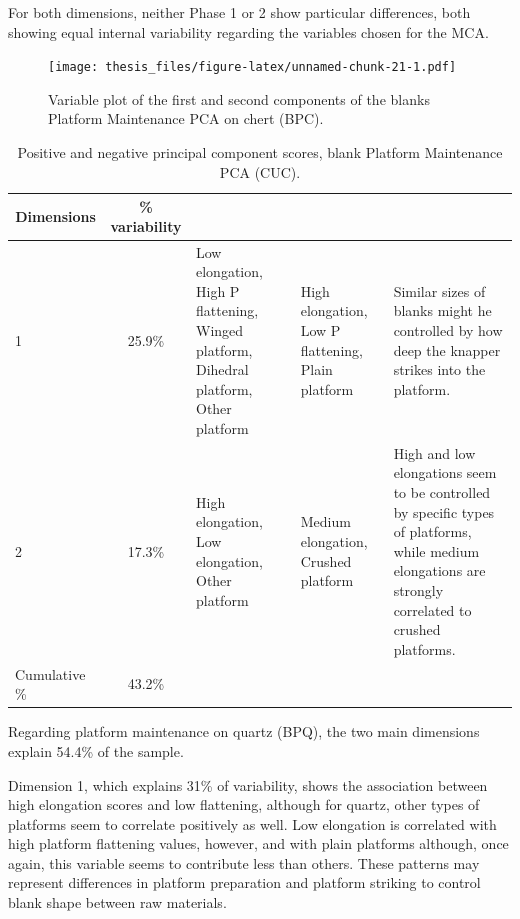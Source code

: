 \documentclass[12pt,twoside]{reedthesis}
\begin{document}
For both dimensions, neither Phase 1 or 2 show particular differences, both showing equal internal variability regarding the variables chosen for the MCA.
\begin{figure}
\centering
\texttt{[image: thesis\_files/figure-latex/unnamed-chunk-21-1.pdf]}
\caption{\label{fig:unnamed-chunk-21}Variable plot of the first and second components of the blanks Platform Maintenance PCA on chert (BPC).}
\end{figure}
\begin{table}[!h]

\caption{\label{tab:unnamed-chunk-22}Positive and negative principal component scores, blank Platform Maintenance PCA (CUC).}
\centering
\begin{tabular}[t]{lc>{\raggedright\arraybackslash}p{3cm}>{\raggedright\arraybackslash}p{3cm}>{\raggedright\arraybackslash}p{3cm}}
\toprule
\multicolumn{1}{c}{\textbf{Dimensions}} & \multicolumn{1}{c}{\textbf{\% variability}} & \multicolumn{1}{>{\centering\arraybackslash}p{3cm}}{\textbf{+}} & \multicolumn{1}{>{\centering\arraybackslash}p{3cm}}{\textbf{-}} & \multicolumn{1}{>{\centering\arraybackslash}p{3cm}}{\textbf{Interpretation}}\\
\midrule
1 & 25.9\% & Low elongation, High P flattening, Winged platform, Dihedral platform, Other platform & High elongation, Low P flattening, Plain platform & Similar sizes of blanks might he controlled by how deep the knapper strikes into the platform.\\
2 & 17.3\% & High elongation, Low elongation, Other platform & Medium elongation, Crushed platform & High and low elongations seem to be controlled by specific types of platforms, while medium elongations are strongly correlated to crushed platforms.\\
Cumulative \% & 43.2\% &  &  & \\
\bottomrule
\end{tabular}
\end{table}
Regarding platform maintenance on quartz (BPQ), the two main dimensions explain 54.4\% of the sample.

Dimension 1, which explains 31\% of variability, shows the association between high elongation scores and low flattening, although for quartz, other types of platforms seem to correlate positively as well. Low elongation is correlated with high platform flattening values, however, and with plain platforms although, once again, this variable seems to contribute less than others. These patterns may represent differences in platform preparation and platform striking to control blank shape between raw materials.
\end{document}

